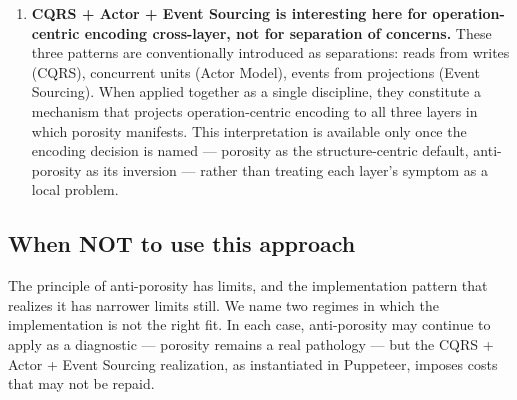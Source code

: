 \documentclass[
]{article}
\newcounter{none} %
\begin{document}
\begin{enumerate}
{  behind four locally-named defects.} Four bodies of work --- relational
  database theory, domain-driven design, REST API contract design, and
  Event Sourcing --- each documented surface manifestations of
  structure-centric encoding in their own vocabulary, without naming the
  encoding decision itself. CQRS, the Actor Model, and Event Sourcing
  are individually well-known constituent patterns; what we claim as
  novel is neither the patterns nor the detection of any single
  porosity, but the observation that the four traditions converge on a
  single architectural choice (structure as the representational
  primary), that \emph{anti-porosity} names its principled inversion
  (operation as the representational primary), and that the inversion is
  implementable rather than merely conceivable. We note explicitly that
  other actor frameworks (Akka, Microsoft Orleans, Proto.Actor,
  EventStore) could \emph{in principle} be extended to satisfy the three
  conditions, but none currently does (§7); the analytic frame's
  independence from any specific realization is therefore
  \emph{conjectural}, not established. Puppeteer is currently the only
  realization that jointly satisfies the three conditions, and the open
  invitation in §5 is the explicit mechanism by which the conjecture of
  broader realizability would be tested.
\item
  \textbf{CQRS + Actor + Event Sourcing is interesting here for
  operation-centric encoding cross-layer, not for separation of
  concerns.} These three patterns are conventionally introduced as
  separations: reads from writes (CQRS), concurrent units (Actor Model),
  events from projections (Event Sourcing). When applied together as a
  single discipline, they constitute a mechanism that projects
  operation-centric encoding to all three layers in which porosity
  manifests. This interpretation is available only once the encoding
  decision is named --- porosity as the structure-centric default,
  anti-porosity as its inversion --- rather than treating each layer's
  symptom as a local problem.
\end{enumerate}

\subsection{When NOT to use this
approach}\label{when-not-to-use-this-approach}

The principle of anti-porosity has limits, and the implementation
pattern that realizes it has narrower limits still. We name two regimes
in which the implementation is not the right fit. In each case,
anti-porosity may continue to apply as a diagnostic --- porosity remains
a real pathology --- but the CQRS + Actor + Event Sourcing realization,
as instantiated in Puppeteer, imposes costs that may not be repaid.
\end{document}
